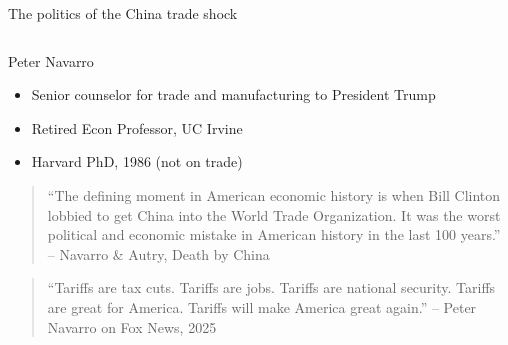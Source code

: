 \documentclass[notes,11pt, aspectratio=169, xcolor=table]{beamer}
\newenvironment{wideitemize}{\itemize\addtolength{\itemsep}{10pt}}{\enditemize}
\begin{document}
\begin{frame}{The politics of the China trade shock}
\begin{columns}[T]
\begin{column}{.65\textwidth}
{\begin{wideitemize}
    \item Peter Navarro
    \begin{itemize}
        \item Senior counselor for trade and manufacturing to President Trump
        \item Retired Econ Professor, UC Irvine
        \item Harvard PhD, 1986 (not on trade)
    \end{itemize}

    \vspace{12pt}


        \begin{quote}
        ``The defining moment in American economic history is when Bill Clinton lobbied to get China into the World Trade Organization. It was the worst political and economic mistake in American history in the last 100 years.'' -- Navarro \& Autry, Death by China 
    \end{quote}

    \vspace{12pt}

    \begin{quote}
        ``Tariffs are tax cuts. Tariffs are jobs. Tariffs are national security. Tariffs are great for America. Tariffs will make America great again.'' -- Peter Navarro on Fox News, 2025 
    \end{quote}
    
\end{wideitemize}
}
\end{column}%
\end{columns}

\end{frame}
\end{document}
